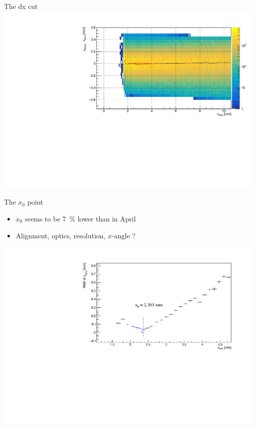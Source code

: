 \documentclass{beamer}
\begin{document}
\begin{frame}\scriptsize
	\begin{block}{The dx cut}
             \includegraphics[width=1.0\textwidth]{Run_323316_130_murad_beta_star_0p25_m_deltax.pdf}\\
	\end{block}
	
\end{frame}

\begin{frame}\scriptsize
	\begin{block}{The $x_{0}$ point}
    		\begin{itemize}
			\item $x_{0}$ seems to be 7~\% lower than in April
			\item Alignment, optics, resolution, $x$-angle ?
		\end{itemize}

        \includegraphics[width=1.0\textwidth]{Run_323316_130_murad_beta_star_0p25_m/min2.pdf}\\
	\end{block}
	
\end{frame}
\end{document}
